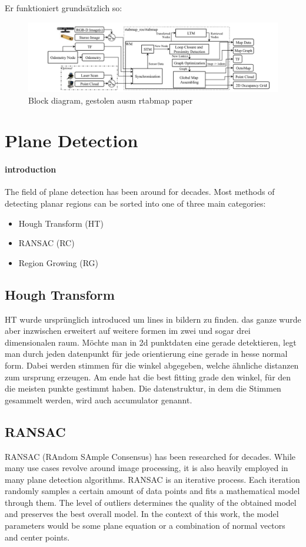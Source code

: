 \documentclass[main.tex]{subfiles}
\begin{document}
Er funktioniert grundsätzlich so:
\begin{figure}[!h]
    \centering
    \includegraphics[width=15 cm]{images/rtabmap.png}
    \caption{Block diagram, gestolen ausm rtabmap paper \cite[Figure~1]{Labbé_Michaud_2019}}
    \label{fig:rtabmap}
\end{figure}

\section{Plane Detection}

\paragraph*{introduction}
The field of plane detection has been around for decades. Most methods of detecting planar regions can be sorted into one of three main categories:
\begin{itemize}
    \item Hough Transform (HT)
    \item RANSAC (RC)
    \item Region Growing (RG)
\end{itemize}

\subsection*{Hough Transform}
HT wurde ursprünglich introduced um lines in bildern zu finden. das ganze wurde aber inzwischen erweitert auf weitere 
formen im zwei und sogar drei dimensionalen raum.
Möchte man in 2d punktdaten eine gerade detektieren, legt man durch jeden datenpunkt für jede orientierung eine gerade in hesse normal form. Dabei werden stimmen für 
die winkel abgegeben, welche ähnliche distanzen zum ursprung erzeugen. Am ende hat die best fitting grade den winkel, für den die meisten punkte gestimmt haben.
Die datenstruktur, in dem die Stimmen gesammelt werden, wird auch accumulator genannt.


\subsection*{RANSAC}
RANSAC (RAndom SAmple Consensus) has been researched for decades. While many use cases revolve around image processing, it is also heavily employed in many plane detection algorithms\cite{Sun_Mordohai_2019,Yang_Forstner,Ashraf_Ahmed_2017}.
RANSAC is an iterative process. Each iteration randomly samples a certain amount of data points and fits a mathematical model through them. The level of outliers determines the quality of the obtained model and preserves the best overall model.
In the context of this work, the model parameters would be some plane equation or a combination of normal vectors and center points.
\end{document}
